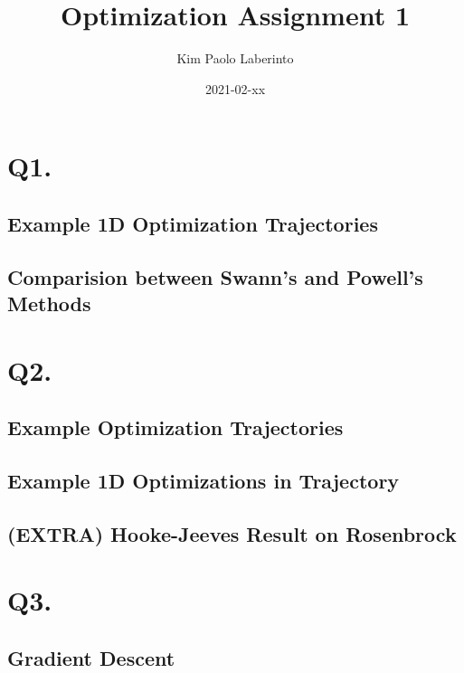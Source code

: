 \documentclass{article}
\title{Optimization Assignment 1}
\date{2021-02-xx}
\author{Kim Paolo Laberinto}
\begin{document}
    \maketitle
    \newpage

    \tableofcontents
    \newpage

    \section{Q1.}

    \subsection{Example 1D Optimization Trajectories}



    \subsection{Comparision between Swann's and Powell's Methods}

    \section{Q2.}

    \subsection{Example Optimization Trajectories}

    \subsection{Example 1D Optimizations in Trajectory}

    \subsection{(EXTRA) Hooke-Jeeves Result on Rosenbrock}

    \section{Q3.}

    \subsection{Gradient Descent}
\end{document}
